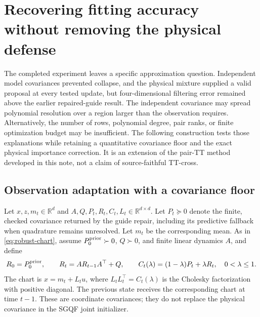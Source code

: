 \section{Recovering fitting accuracy without removing the physical defense}
\label{sec:protected-fitting}

The completed experiment leaves a specific approximation question. Independent
model covariances prevented collapse, and the physical mixture supplied a
valid proposal at every tested update, but four-dimensional filtering error
remained above the earlier repaired-guide result. The independent covariance
may spread polynomial resolution over a region larger than the observation
requires. Alternatively, the number of rows, polynomial degree, pair ranks,
or finite optimization budget may be insufficient. The following construction
tests those explanations while retaining a quantitative covariance floor and
the exact physical importance correction. It is an extension of the pair-TT
method developed in this note, not a claim of source-faithful TT-cross.

\subsection{Observation adaptation with a covariance floor}

Let $x,z,m_t\in\mathbb R^d$ and $A,Q,P_t,R_t,C_t,L_t\in\mathbb R^{d\times d}$.
Let $P_t\succeq0$ denote the finite, checked covariance returned by the guide
repair, including its predictive fallback when quadrature remains unresolved.
Let $m_t$ be the corresponding mean. As in
\eqref{eq:robust-chart}, assume $P_0^{\rm prior}\succ0$, $Q\succ0$, and
finite linear dynamics $A$, and define
\begin{equation}
 R_0=P_0^{\rm prior},\qquad R_t=AR_{t-1}A^\top+Q,\qquad
 C_t(\lambda)=(1-\lambda)P_t+\lambda R_t,
 \quad 0<\lambda\le1.
 \label{eq:a11-blend}
\end{equation}
The chart is $x=m_t+L_tu$, where $L_tL_t^\top=C_t(\lambda)$ is the
Cholesky factorization with positive diagonal. The previous state receives
the corresponding chart at time $t-1$. These are coordinate covariances;
they do not replace the physical covariance in the SGQF joint initializer.


